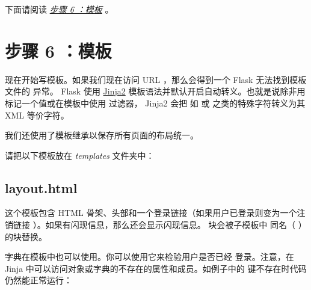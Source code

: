 \documentclass[a4paper,12pt]{sphinxmanual}
\begin{document}
下面请阅读 {\hyperref[tutorial/templates:tutorial-templates]{\emph{步骤 6 ：模板}}} 。


\section{步骤 6 ：模板}
\label{tutorial/templates:tutorial-templates}\label{tutorial/templates::doc}\label{tutorial/templates:id1}
现在开始写模板。如果我们现在访问 URL ，那么会得到一个 Flask 无法找到模板文件的
异常。 Flask 使用 \href{http://jinja.pocoo.org/2/documentation/templates}{Jinja2} 模板语法并默认开启自动转义。也就是说除非用
{\hyperref[api:flask.Markup]{}} 标记一个值或在模板中使用  过滤器， Jinja2 会把
如 \code{\textless{}} 或 \code{\textgreater{}} 之类的特殊字符转义为其 XML 等价字符。

我们还使用了模板继承以保存所有页面的布局统一。

请把以下模板放在 \emph{templates} 文件夹中：


\subsection{layout.html}
\label{tutorial/templates:jinja2}\label{tutorial/templates:layout-html}
这个模板包含 HTML 骨架、头部和一个登录链接（如果用户已登录则变为一个注销链接
）。如果有闪现信息，那么还会显示闪现信息。  块会被子模板中
同名（  ）的块替换。

{\hyperref[api:flask.session]{}} 字典在模板中也可以使用。你可以使用它来检验用户是否已经
登录。注意，在 Jinja 中可以访问对象或字典的不存在的属性和成员。如例子中的
 键不存在时代码仍然能正常运行：
\end{document}
